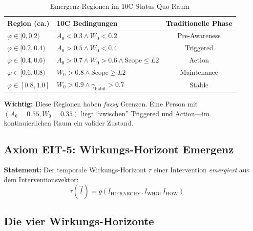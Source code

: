 \begin{table}[htbp]
\centering
\caption{Emergenz-Regionen im 10C Status Quo Raum}
\label{tab:18-emergence-regions}
\renewcommand{\arraystretch}{1.4}
\small
\begin{tabular}{@{}lp{6cm}c@{}}
\toprule
\textbf{Region (ca.)} & \textbf{10C Bedingungen} & \textbf{Traditionelle Phase} \\
\midrule
$\varphi \in [0, 0.2)$ & $A_0 < 0.3 \land W_0 < 0.2$ & Pre-Awareness \\
$\varphi \in [0.2, 0.4)$ & $A_0 > 0.5 \land W_0 < 0.4$ & Triggered \\
$\varphi \in [0.4, 0.6)$ & $A_0 > 0.7 \land W_0 > 0.6 \land \text{Scope} \leq L2$ & Action \\
$\varphi \in [0.6, 0.8)$ & $W_0 > 0.8 \land \text{Scope} \geq L2$ & Maintenance \\
$\varphi \in [0.8, 1.0]$ & $W_0 > 0.9 \land \gamma_{\text{habit}} > 0.7$ & Stable \\
\bottomrule
\end{tabular}
\end{table}

\textbf{Wichtig:} Diese Regionen haben \textit{fuzzy} Grenzen. Eine Person mit $(A_0 = 0.55, W_0 = 0.35)$ liegt ``zwischen'' Triggered und Action---im kontinuierlichen Raum ein valider Zustand.

\subsection{Axiom EIT-5: Wirkungs-Horizont Emergenz}

\begin{tcolorbox}[colback=blue!5!white, colframe=blue!75!black,
    title=\textbf{Axiom EIT-5: Wirkungs-Horizont als emergente Eigenschaft (aus Appendix TKT)}]

\textbf{Statement:} Der temporale Wirkungs-Horizont $\tau$ einer Intervention \textit{emergiert} aus dem Interventionsvektor:
\begin{equation}
\boxed{\tau(\vec{I}) = g(I_{\text{HIERARCHY}}, I_{\text{WHO}}, I_{\text{HOW}})}
\label{eq:18-horizon-emergence}
\end{equation}

\end{tcolorbox}

\subsection{Die vier Wirkungs-Horizonte}


